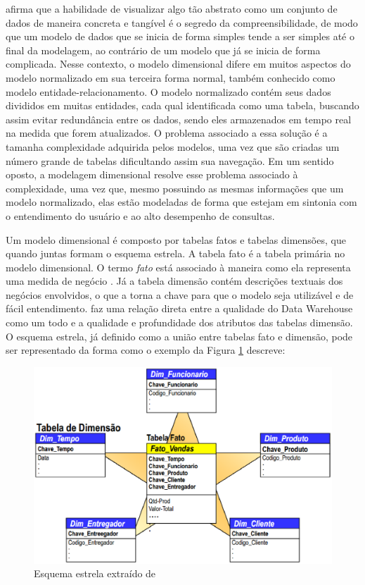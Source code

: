  afirma que a habilidade de visualizar algo tão abstrato como um conjunto de dados  de maneira concreta e tangível é o segredo da compreensibilidade, de modo que um modelo de dados que se inicia de forma simples tende a ser simples até o final da modelagem, ao contrário de um modelo que já se inicia de forma complicada. Nesse contexto, o modelo dimensional difere em muitos aspectos do modelo normalizado em sua terceira forma normal, também conhecido como modelo entidade-relacionamento. O modelo normalizado contém seus dados divididos em muitas entidades, cada qual identificada como uma tabela, buscando assim evitar redundância entre os dados, sendo eles armazenados em tempo real na medida que forem atualizados. O problema associado a essa solução é a tamanha complexidade adquirida pelos modelos, uma vez que são criadas um número grande de tabelas dificultando assim sua navegação. Em um sentido oposto, a modelagem dimensional resolve esse problema associado à complexidade, uma vez que, mesmo possuindo as mesmas informações que um modelo normalizado, elas estão modeladas de forma que estejam em sintonia com o entendimento do usuário e ao alto desempenho de consultas. 

Um modelo dimensional é composto por tabelas fatos e tabelas dimensões, que quando juntas formam o esquema estrela. A tabela fato é a tabela primária no modelo dimensional. O termo \textit{fato} está associado à maneira como ela representa uma medida de negócio \cite{Kimball2002}. Já a tabela dimensão contém descrições textuais dos negócios envolvidos, o que a torna a chave para que o modelo seja utilizável e de fácil entendimento.  faz uma relação direta entre a qualidade do Data Warehouse como um todo e a qualidade e profundidade dos atributos das tabelas dimensão. O esquema estrela, já definido como a união entre tabelas fato e dimensão, pode ser representado da forma como o exemplo da Figura \ref{fig:estrela} descreve:
 
\begin{figure}[h!]
\centering
\includegraphics[keepaspectratio=false,scale=0.50]{figuras/figuras_matheus/star.eps}
\caption{Esquema estrela extraído de }
\label{fig:estrela}
\end{figure}
\FloatBarrier
 
